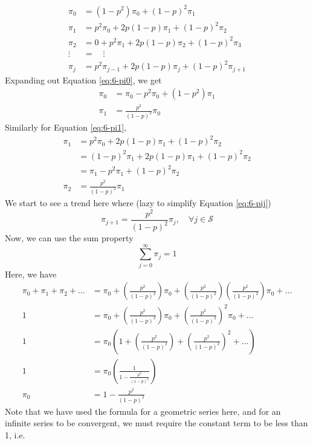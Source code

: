 \documentclass[12pt]{article}
\begin{document}
\begin{align}
    \pi_0 &= (1-p^{2})\pi_0 + (1-p)^{2}\pi_1 \\ \label{eq:6-pi1}
    \pi_1 &= p^{2}\pi_0 + 2p(1-p)\pi_1 + (1-p)^{2} \pi_2 \\ 
    \pi_2 &= 0 + p^{2} \pi_1 + 2p(1-p)\pi_2 + (1-p)^{2}\pi_3 \\ \nonumber
    \vdots & =\quad \vdots \\ \label{eq:6-pij}
    \pi_j &= p^{2}\pi_{j-1} + 2p(1-p)\pi_j + (1-p)^{2}\pi_{j+1}
\end{align} Expanding out Equation \ref{eq:6-pi0}, we get \begin{align*}
    \pi_0 &= \pi_0 - p^{2} \pi_0 + (1-p^{2})\pi_1 \\ 
    \pi_1 &= \frac{p^{2}}{(1-p)^{2}}\pi_0
\end{align*} Similarly for Equation \ref{eq:6-pi1}, \begin{align*}
    \pi_1 &= p^{2} \pi_0 + 2p(1-p)\pi_1 + (1-p)^{2}\pi_2 \\ 
    &= (1-p)^{2}\pi_1 + 2p(1-p)\pi_1 + (1-p)^{2}\pi_2 \\ 
    &= \pi_1 - p^{2}\pi_1 + (1-p)^{2}\pi_2 \\ 
    \pi_2 &= \frac{p^{2}}{(1-p)^{2}} \pi_1
\end{align*} We start to see a trend here where (lazy to simplify Equation \ref{eq:6-pij})\begin{equation}\label{eq:6-pij1}
    \pi_{j+1} = \frac{p^{2}}{(1-p)^{2}}\pi_{j}, \quad \forall j \in \mathcal{S}
\end{equation} Now, we can use the sum property \begin{equation}
    \sum_{j=0}^{\infty} \pi_j = 1
\end{equation} Here, we have \begin{align} \nonumber
    \pi_0 + \pi_1 + \pi_2 + \dots &= \pi_0 + \left( \frac{p^{2}}{(1-p)^{2}} \right)\pi_0 + \left( \frac{p^{2}}{(1-p)^{2}} \right)\left( \frac{p^{2}}{(1-p)^{2}} \right)\pi_0 + \dots \\ \nonumber
    1 &= \pi_0 + \left( \frac{p^{2}}{(1-p)^{2}} \right)\pi_0 + \left( \frac{p^{2}}{(1-p)^{2}} \right)^{2}\pi_0 + \dots \\ \nonumber
    1 &= \pi_0 \left( 1 + \left( \frac{p^{2}}{(1-p)^{2}} \right) + \left( \frac{p^{2}}{(1-p)^{2}} \right)^{2} + \dots \right) \\ \nonumber
    1 &= \pi_0 \left( \frac{1}{1 - \frac{p^{2}}{(1-p)^{2}}} \right) \\ \label{eq:6-pi02}
    \pi_0 &= 1 - \frac{p^{2}}{(1-p)^{2}}
\end{align} Note that we have used the formula for a geometric series here, and for an infinite series to be convergent, we must require the constant term to be less than 1, i.e. \begin{align*}

\end{align*}
\end{document}
